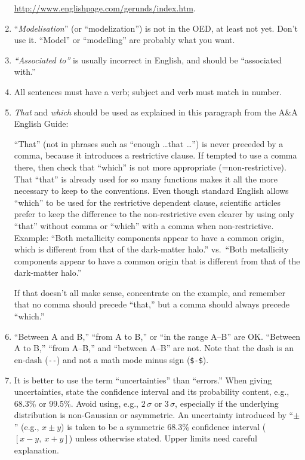 \documentclass[letterpaper,11pt]{article}
\begin{document}
\begin{enumerate}
\url{http://www.englishpage.com/gerunds/index.htm}.

\item ``{\it Modelisation\/}'' (or ``modelization'') is not in the
OED, at least not yet.  Don't use it.  ``Model'' or ``modelling'' are probably
what you want.

\item

{\it ``Associated to''\/} is usually incorrect in English, and should be
``associated with.''


\item All sentences must have a verb; subject and verb must match in number.

\item {\it That\/} and {\it which\/} should be used as explained in this paragraph from the A\&A English Guide:

``That'' (not in phrases such as ``enough \dots that \dots'') is never
preceded by a comma, because it introduces a restrictive clause.  If tempted
to use a comma there, then check that ``which'' is not more appropriate
(=non-restrictive).  That ``that'' is already used for so many functions makes
it all the more necessary to keep to the conventions.  Even though standard
English allows ``which'' to be used for the restrictive dependent clause,
scientific articles prefer to keep the difference to the non-restrictive even
clearer by using only ``that'' without comma or ``which'' with a comma when
non-restrictive.  Example: ``Both metallicity components appear to have a
common origin, which is different from that of the dark-matter halo.'' vs.\
``Both metallicity components appear to have a common origin that is different
from that of the dark-matter halo.''

If that doesn't all make sense, concentrate on the example, and remember that
no comma should precede ``that,'' but a comma should always precede ``which.''

\item ``Between A and B,'' ``from A to B,'' or ``in the range A--B'' are
\hbox{OK}.  ``Between A to B,'' ``from A--B,'' and ``between A--B'' are not.  Note that the dash is an en-dash (\verb|--|) and not a math mode minus sign (\verb|$-$|).

\item It is better to use the term ``uncertainties'' than ``errors.''  When
giving uncertainties, state the confidence interval and its probability
content, e.g., 68.3\% or 99.5\%.  Avoid using, e.g., $2\,\sigma$ or $3\,\sigma$,
especially if the underlying distribution is non-Gaussian or asymmetric.  An
uncertainty introduced by ``$\pm$'' (e.g., $x\pm y$) is taken to be a
symmetric 68.3\% confidence interval ($[x-y,\ x+y]$) unless otherwise stated.
Upper limits need careful explanation. 


\end{enumerate}
\end{document}
